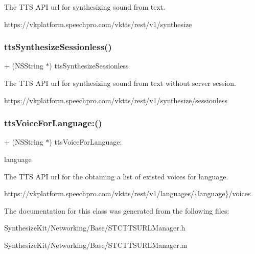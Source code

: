 The T\+TS A\+PI url for synthesizing sound from text. 
\begin{DoxyCode}
https:\textcolor{comment}{//vkplatform.speechpro.com/vktts/rest/v1/synthesize}
\end{DoxyCode}
 \hypertarget{interface_s_t_c_t_t_s_u_r_l_manager_a9beb9bd59e7012c1e839cbe752d3304f}{}\label{interface_s_t_c_t_t_s_u_r_l_manager_a9beb9bd59e7012c1e839cbe752d3304f} 
\subsubsection{\texorpdfstring{tts\+Synthesize\+Sessionless()}{ttsSynthesizeSessionless()}}
{\footnotesize\ttfamily + (N\+S\+String $\ast$) tts\+Synthesize\+Sessionless \begin{DoxyParamCaption}{ }\end{DoxyParamCaption}}

The T\+TS A\+PI url for synthesizing sound from text without server session. 
\begin{DoxyCode}
https:\textcolor{comment}{//vkplatform.speechpro.com/vktts/rest/v1/synthesize/sessionless}
\end{DoxyCode}
 \hypertarget{interface_s_t_c_t_t_s_u_r_l_manager_a11a3d86de1b21ab5d4697994021b1ac5}{}\label{interface_s_t_c_t_t_s_u_r_l_manager_a11a3d86de1b21ab5d4697994021b1ac5} 
\subsubsection{\texorpdfstring{tts\+Voice\+For\+Language\+:()}{ttsVoiceForLanguage:()}}
{\footnotesize\ttfamily + (N\+S\+String $\ast$) tts\+Voice\+For\+Language\+: \begin{DoxyParamCaption}\item[{(N\+S\+String $\ast$)}]{language }\end{DoxyParamCaption}}

The T\+TS A\+PI url for the obtaining a list of existed voices for language. 
\begin{DoxyCode}
https:\textcolor{comment}{//vkplatform.speechpro.com/vktts/rest/v1/languages/\{language\}/voices}
\end{DoxyCode}
 

The documentation for this class was generated from the following files\+:\begin{DoxyCompactItemize}
\item 
Synthesize\+Kit/\+Networking/\+Base/S\+T\+C\+T\+T\+S\+U\+R\+L\+Manager.\+h\item 
Synthesize\+Kit/\+Networking/\+Base/S\+T\+C\+T\+T\+S\+U\+R\+L\+Manager.\+m\end{DoxyCompactItemize}
